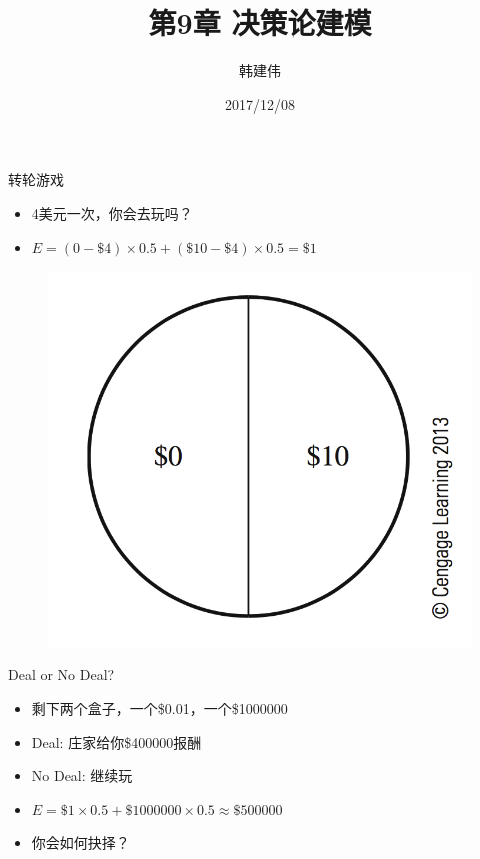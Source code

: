 \documentclass[UTF8]{ctexbeamer}
\title{第9章 决策论建模}
\author{韩建伟}
\institute{
  信息学院\\
  \texttt{hanjianwei@zjgsu.edu.cn}
}
\date{2017/12/08}
\begin{document}
\begin{frame}[plain]
  \titlepage{}
\end{frame}

\begin{frame}{转轮游戏}

  \begin{itemize}
  \item<1-> 4美元一次，你会去玩吗？
  \item<2-> $E = (0-\$4) \times 0.5 + (\$10 - \$4) \times 0.5 = \$1$
  \end{itemize}

  \begin{figure}
    \centering
    \includegraphics[height=.4\textheight{}]{9_1.png}
  \end{figure}
  
\end{frame}

\begin{frame}{Deal or No Deal?}

  \begin{itemize}
  \item<1-> 剩下两个盒子，一个\$0.01，一个\$1000000
  \item<1-> Deal: 庄家给你\$400000报酬
  \item<1-> No Deal: 继续玩
  \item<2-> $E = \$1 \times 0.5 + \$1000000 \times 0.5 \approx \$500000$
  \item<3-> 你会如何抉择？
  \end{itemize}
  
\end{frame}
\end{document}
